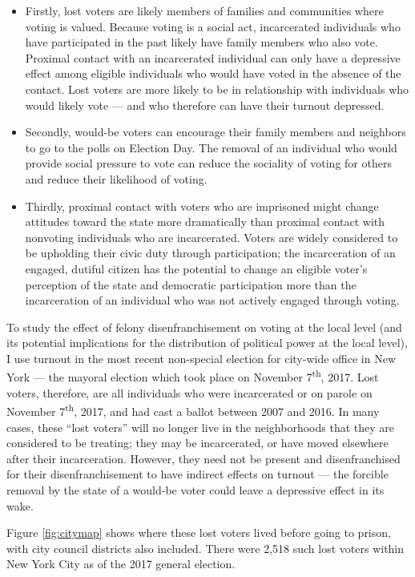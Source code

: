 \documentclass[
  12pt,
]{article}
\begin{document}
\begin{itemize}
\item
  Firstly, lost voters are likely members of families and communities where voting is valued. Because voting is a social act, incarcerated individuals who have participated in the past likely have family members who also vote. Proximal contact with an incarcerated individual can only have a depressive effect among eligible individuals who would have voted in the absence of the contact. Lost voters are more likely to be in relationship with individuals who would likely vote --- and who therefore can have their turnout depressed.
\item
  Secondly, would-be voters can encourage their family members and neighbors to go to the polls on Election Day. The removal of an individual who would provide social pressure to vote can reduce the sociality of voting for others and reduce their likelihood of voting.
\item
  Thirdly, proximal contact with voters who are imprisoned might change attitudes toward the state more dramatically than proximal contact with nonvoting individuals who are incarcerated. Voters are widely considered to be upholding their civic duty through participation; the incarceration of an engaged, dutiful citizen has the potential to change an eligible voter's perception of the state and democratic participation more than the incarceration of an individual who was not actively engaged through voting.
\end{itemize}

To study the effect of felony disenfranchisement on voting at the local level (and its potential implications for the distribution of political power at the local level), I use turnout in the most recent non-special election for city-wide office in New York --- the mayoral election which took place on November 7\textsuperscript{th}, 2017. Lost voters, therefore, are all individuals who were incarcerated or on parole on November 7\textsuperscript{th}, 2017, and had cast a ballot between 2007 and 2016. In many cases, these ``lost voters'' will no longer live in the neighborhoods that they are considered to be treating; they may be incarcerated, or have moved elsewhere after their incarceration. However, they need not be present and disenfranchised for their disenfranchisement to have indirect effects on turnout --- the forcible removal by the state of a would-be voter could leave a depressive effect in its wake.

Figure \ref{fig:citymap} shows where these lost voters lived before going to prison, with city council districts also included. There were 2,518 such lost voters within New York City as of the 2017 general election.
\end{document}

